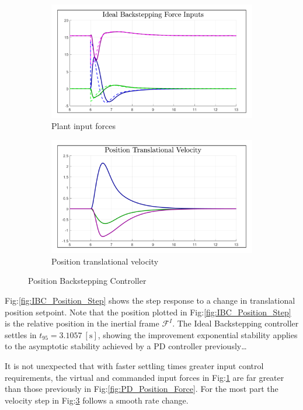 \begin{figure}[htbp]\ContinuedFloat
\begin{subfigure}{0.49\textwidth}
\centering
\includegraphics[width=\textwidth]{graphs/IBC_Position_Force}
\caption{Plant input forces}
\label{fig:IBC_Position_Force}
\end{subfigure}
\begin{subfigure}{0.49\textwidth}
\centering
\includegraphics[width=\textwidth]{graphs/IBC_Position_Velocity}
\caption{Position translational velocity}
\label{fig:IBC_Position_Velocity}
\end{subfigure}
\caption{Position Backstepping Controller}
\end{figure}
\par
Fig:\ref{fig:IBC_Position_Step} shows the step response to a change in translational position setpoint. Note that the position plotted in Fig:\ref{fig:IBC_Position_Step} is the relative position in the inertial frame $\mathcal{F}^{I}$. The Ideal Backstepping controller settles in $t_{95}=3.1057~[\text{s}]$, showing the improvement exponential stability applies to the asymptotic stability achieved by a PD controller previously\ldots
\par
It is not unexpected that with faster settling times greater input control requirements, the virtual and commanded input forces in Fig:\ref{fig:IBC_Position_Force} are far greater than those previously in Fig:\ref{fig:PD_Position_Force}. For the most part the velocity step in Fig:\ref{fig:IBC_Position_Velocity} follows a smooth rate change.
